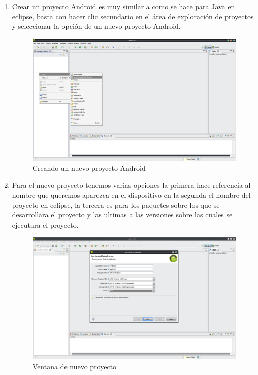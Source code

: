 \documentclass[11pt]{book}
\begin{document}
\begin{enumerate}[1.]

\item Crear un proyecto Android es muy similar a como se hace para Java en eclipse, basta con hacer clic secundario en el área de exploración de proyectos y seleccionar la opción de un nuevo proyecto Android.

\begin{figure}[H]
  \centering
    \includegraphics[width=1.0\textwidth]{tutorial_19}
  \caption{Creando un nuevo proyecto Android}
  \label{fig:tutorial_19}
\end{figure}

\newpage
\item Para el nuevo proyecto tenemos varias opciones la primera hace referencia al nombre que queremos aparezca en el dispositivo en la segunda el nombre del proyecto en eclipse, la tercera es para los paquetes sobre los que se desarrollara el proyecto y las ultimas a las versiones sobre las cuales se ejecutara el proyecto.

\begin{figure}[H]
  \centering
    \includegraphics[width=1.0\textwidth]{tutorial_20}
  \caption{Ventana de nuevo proyecto}
  \label{fig:tutorial_20}
\end{figure}


\end{enumerate}
\end{document}
